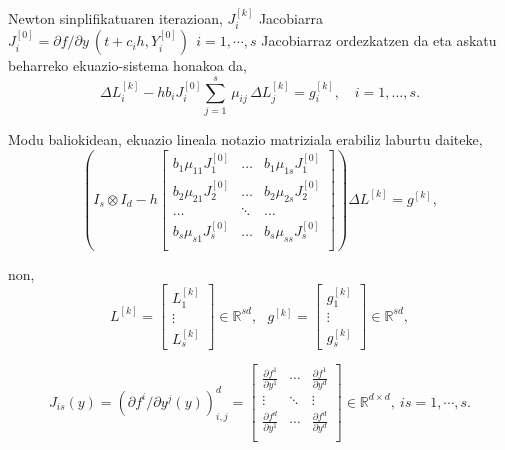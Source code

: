 Newton sinplifikatuaren iterazioan, $J_i^{[k]}$ Jacobiarra $J_i^{[0]}=\partial f / \partial y \ (t+c_ih, Y_i^{[0]}) \ \ i=1,\cdots,s$ Jacobiarraz ordezkatzen da eta askatu beharreko ekuazio-sistema honakoa da,
\begin{equation*}
\Delta L_{i}^{[k]}  - h b_i J_i^{[0]} \sum_{j=1}^{s}\, \mu_{ij} \, \Delta L_{j}^{[k]}=g_i^{[k]}, \quad  i=1 ,\ldots, s.
\end{equation*}

Modu baliokidean, ekuazio lineala notazio matriziala erabiliz laburtu daiteke,
\begin{equation*}
\left (I_s \otimes I_d - h  
\begin{bmatrix}
b_1 \mu_{11} J_1^{[0]} & \dots & b_1 \mu_{1s} J_1^{[0]} \\
b_2 \mu_{21} J_2^{[0]} & \dots & b_2 \mu_{2s} J_2^{[0]} \\
\dots          & \ddots & \dots \\
b_s \mu_{s1} J_s^{[0]} & \dots & b_s \mu_{ss} J_s^{[0]} \\ 
\end{bmatrix} \right) \Delta L^{[k]} =g^{[k]},
\end{equation*}

non,
\begin{equation*}
L^{[k]}=\begin{bmatrix}
L_1^{[k]} \\
\vdots \\
L_s^{[k]}
\end{bmatrix} \in \mathbb{R}^{sd}, \ \ \
g^{[k]}=\begin{bmatrix}
g_1^{[k]} \\
\vdots \\
g_s^{[k]}
\end{bmatrix} \in \mathbb{R}^{sd},  
\end{equation*}

\begin{equation*}
\label{eq:907}
J_{is}(y)=\left(\partial f^i/\partial y^j (y)\right)_{i,j}^d=
\begin{bmatrix}
    \frac{\partial f^1}{\partial y^1} & \cdots & \frac{\partial f^1}{\partial y^d}\\    
    \vdots & \ddots & \vdots \\    
    \frac{\partial f^d}{\partial y^1} & \cdots & \frac{\partial f^d}{\partial y^d}\\    
\end{bmatrix} \in \mathbb{R}^{d \times d}, \ is=1,\cdots,s.
\end{equation*}

